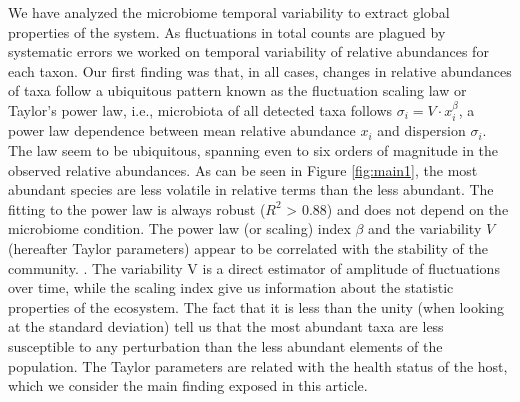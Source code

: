 
We have analyzed the microbiome temporal variability to extract global properties of the system. As fluctuations in total counts are plagued by systematic errors we worked on temporal variability of relative abundances for each taxon. Our first finding was that, in all cases, changes in relative abundances of taxa follow a ubiquitous pattern known as the fluctuation scaling law\cite{fs} or Taylor's power law\cite{taylor}, i.e., microbiota of all detected taxa follows $\sigma_i  = V\cdot x_i^{\beta}$, a power law dependence between mean relative abundance $x_i$ and dispersion $\sigma_i$. The law seem to be ubiquitous, spanning even to six orders of magnitude in the observed relative abundances. As can be seen in Figure \ref{fig:main1}, the most abundant species are less volatile in relative terms than the less abundant. The fitting to the power law is always robust ($R^{2}$ > 0.88) and does not depend on the microbiome condition. The power law (or scaling) index $\beta$ and the variability $V$ (hereafter Taylor parameters) appear to be correlated with the stability of the community. . The variability V is a direct estimator of amplitude of fluctuations over time, while the scaling index give us information about the statistic properties of the ecosystem. The fact that it is less than the unity (when looking at the standard deviation) tell us that the most abundant taxa are less susceptible to any perturbation than the less abundant elements of the population. The Taylor parameters are related with the health status of the host, which we consider the main finding exposed in this article.

